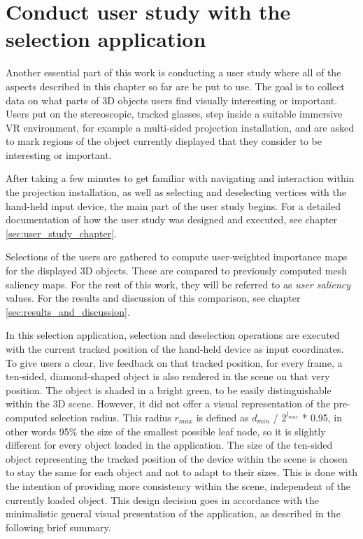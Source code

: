 	\section {Conduct user study with the selection application}
	\label{sec:conduct_user_study_with_the_selection_application}
Another essential part of this work is conducting a user study where all of the aspects described in this chapter so far are be put to use. The goal is to collect data on what parts of 3D objects users find visually interesting or important. Users put on the stereoscopic, tracked glasses, step inside a suitable immersive VR environment, for example a multi-sided projection installation, and are asked to mark regions of the object currently displayed that they consider to be interesting or important.

After taking a few minutes to get familiar with navigating and interaction within the projection installation, as well as selecting and deselecting vertices with the hand-held input device, the main part of the user study begins. For a detailed documentation of how the user study was designed and executed, see chapter \ref{sec:user_study_chapter}.

Selections of the users are gathered to compute user-weighted importance maps for the displayed 3D objects. These are compared to previously computed mesh saliency maps. For the rest of this work, they will be referred to as \textit{user saliency} values. For the results and discussion of this comparison, see chapter \ref{sec:results_and_discussion}.

In this selection application, selection and deselection operations are executed with the current tracked position of the hand-held device as input coordinates. To give users a clear, live feedback on that tracked position, for every frame, a ten-sided, diamond-shaped object is also rendered in the scene on that very position. The object is shaded in a bright green, to be easily distinguishable within the 3D scene. However, it did not offer a visual representation of the pre-computed selection radius. This radius $r_{max}$ is defined as $d_{min}$ / $2^{l_{max}}$ * 0.95, in other words 95\% the size of the smallest possible leaf node, so it is slightly different for every object loaded in the application. The size of the ten-sided object representing the tracked position of the device within the scene is chosen to stay the same for each object and not to adapt to their sizes. This is done with the intention of providing more consistency within the scene, independent of the currently loaded object. This design decision goes in accordance with the minimalistic general visual presentation of the application, as described in the following brief summary.

